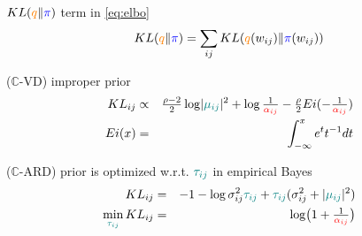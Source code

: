 \documentclass[handout]{beamer}
\newcommand{\real}{\mathbb{R}}
\newcommand{\cplx}{\mathbb{C}}
\begin{document}
\begin{frame}[c]{\insertsection}

  $\mathop{KL}({\color{orange} q} \| {\color{blue} \pi})$ term in \eqref{eq:elbo}
  \begin{equation*}
    \mathop{KL}({\color{orange} q} \| {\color{blue} \pi})
      = \sum_{ij} \mathop{KL}({\color{orange} q}(w_{ij}) \| {\color{blue} \pi}(w_{ij}))
  \end{equation*}

  \bigskip
  ($\cplx$-VD) improper prior
  \begin{eqnarray*}
    \mathop{KL}\nolimits_{ij}
      &\propto&
        \tfrac{\rho - 2}2 \log \lvert {\color{teal} \mu_{ij}} \rvert^2
        + \log \tfrac1{{\color{red} \alpha_{ij}}}
        - \tfrac\rho2 Ei( - \tfrac1{{\color{red} \alpha_{ij}}})
      \\
    Ei(x) &=& \int_{-\infty}^x e^t t^{-1} dt
  \end{eqnarray*}

  \bigskip
  ($\cplx$-ARD) prior is optimized w.r.t. ${\color{teal} \tau_{ij}}$ in empirical Bayes
  \begin{eqnarray*}
    \mathop{KL}\nolimits_{ij}
      &=& -1
        - \log \sigma^2_{ij} {\color{teal} \tau_{ij}}
        + {\color{teal} \tau_{ij}} (\sigma^2_{ij} + \lvert {\color{teal} \mu_{ij}} \rvert^2)
      \\
    \min_{{\color{teal} \tau_{ij}}} \mathop{KL}\nolimits_{ij}
      &=& \log \bigl( 1 + \tfrac1{{\color{red} \alpha_{ij}}} \bigr)
  \end{eqnarray*}

\end{frame}
\end{document}

